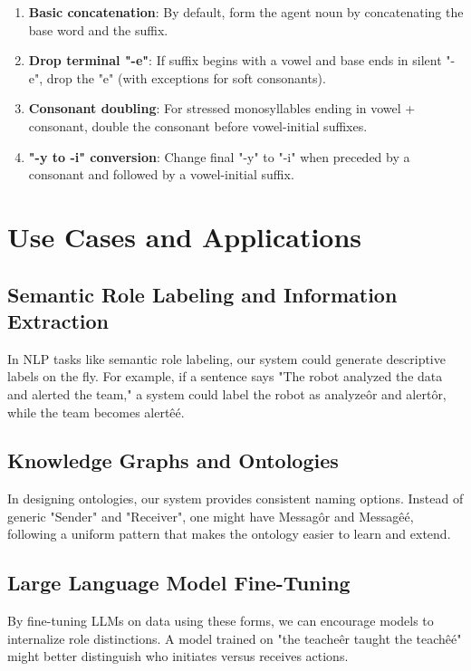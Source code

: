 \documentclass[11pt]{article}
\begin{document}
\begin{enumerate}
\item \textbf{Basic concatenation}: By default, form the agent noun by concatenating the base word and the suffix.

\item \textbf{Drop terminal "-e"}: If suffix begins with a vowel and base ends in silent "-e", drop the "e" (with exceptions for soft consonants).

\item \textbf{Consonant doubling}: For stressed monosyllables ending in vowel + consonant, double the consonant before vowel-initial suffixes.

\item \textbf{"-y to -i" conversion}: Change final "-y" to "-i" when preceded by a consonant and followed by a vowel-initial suffix.
\end{enumerate}

\section{Use Cases and Applications}

\subsection{Semantic Role Labeling and Information Extraction}

In NLP tasks like semantic role labeling, our system could generate descriptive labels on the fly. For example, if a sentence says "The robot analyzed the data and alerted the team," a system could label the robot as analyzeôr and alertôr, while the team becomes alertêé.

\subsection{Knowledge Graphs and Ontologies}

In designing ontologies, our system provides consistent naming options. Instead of generic "Sender" and "Receiver", one might have Messagôr and Messagêé, following a uniform pattern that makes the ontology easier to learn and extend.

\subsection{Large Language Model Fine-Tuning}

By fine-tuning LLMs on data using these forms, we can encourage models to internalize role distinctions. A model trained on "the teacheêr taught the teachêé" might better distinguish who initiates versus receives actions.
\end{document}
